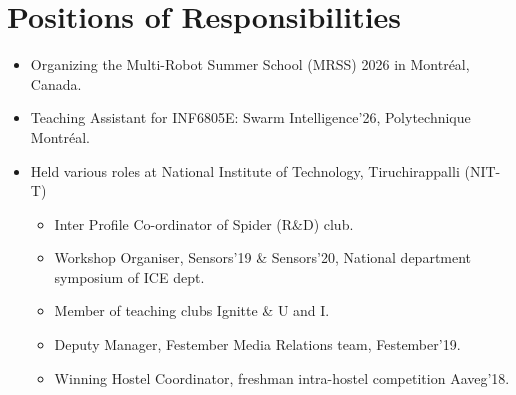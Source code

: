 \documentclass[letterpaper,10pt]{article}
\begin{document}
\section*{Positions of Responsibilities}
\begin{itemize}
    \item Organizing the Multi-Robot Summer School (MRSS) 2026 in Montréal, Canada.
    \item Teaching Assistant for INF6805E: Swarm Intelligence'26, Polytechnique Montréal.
    \item Held various roles at National Institute of Technology, Tiruchirappalli (NIT-T)
    \begin{itemize}
        \item Inter Profile Co-ordinator of Spider (R\&D) club.
        \item Workshop Organiser, Sensors'19 \& Sensors'20, National department symposium of ICE dept.
        \item Member of teaching clubs Ignitte \& U and I.
        \item Deputy Manager, Festember Media Relations team, Festember'19.
        \item Winning Hostel Coordinator, freshman intra-hostel competition Aaveg'18.
    \end{itemize}
\end{itemize}
\end{document}
